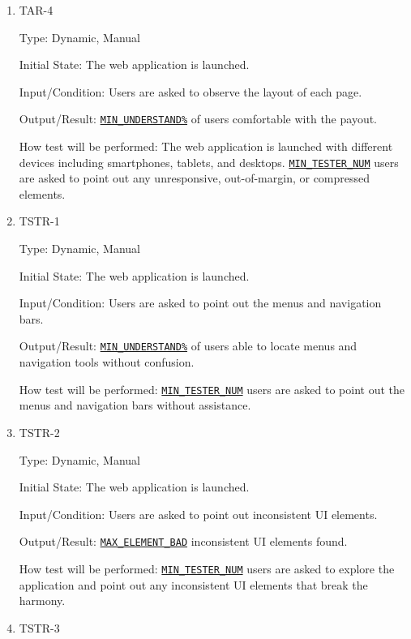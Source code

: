 \documentclass[12pt, titlepage]{article}
\begin{document}
\begin{enumerate}
\item{TAR-4\\}\label{TAR-4}

Type: Dynamic, Manual
					
Initial State: The web application is launched.
					
Input/Condition: Users are asked to observe the layout of each page.
					
Output/Result: \hyperref[MIN_UNDERSTAND]{\texttt{MIN\_UNDERSTAND\%}} of users comfortable with the payout.
					
How test will be performed: The web application is launched with different devices including smartphones, tablets, and desktops.  \hyperref[MIN_TESTER_NUM]{\texttt{MIN\_TESTER\_NUM}} users are asked to point out any unresponsive, out-of-margin, or compressed elements.

\item{TSTR-1\\}\label{TSTR-1}

Type: Dynamic, Manual
					
Initial State: The web application is launched.
					
Input/Condition: Users are asked to point out the menus and navigation bars.
					
Output/Result: \hyperref[MIN_UNDERSTAND]{\texttt{MIN\_UNDERSTAND\%}} of users able to locate menus and navigation tools without confusion.
					
How test will be performed: \hyperref[MIN_TESTER_NUM]{\texttt{MIN\_TESTER\_NUM}} users are asked to point out the menus and navigation bars without assistance.

\item{TSTR-2\\}\label{TSTR-2}

Type: Dynamic, Manual
					
Initial State: The web application is launched.
					
Input/Condition: Users are asked to point out inconsistent UI elements.
					
Output/Result: \hyperref[MAX_ELEMENT_BAD]{\texttt{MAX\_ELEMENT\_BAD}} inconsistent UI elements found.
					
How test will be performed: \hyperref[MIN_TESTER_NUM]{\texttt{MIN\_TESTER\_NUM}} users are asked to explore the application and point out any inconsistent UI elements that break the harmony.

\item{TSTR-3\\}\label{TSTR-3}


\end{enumerate}
\end{document}
